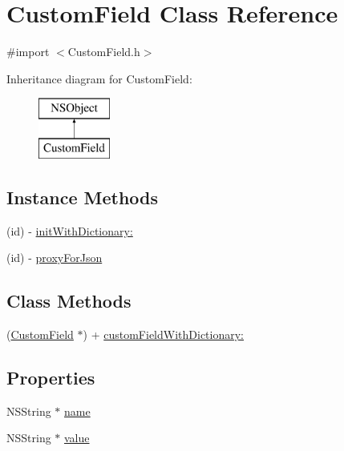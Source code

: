 \hypertarget{interface_custom_field}{\section{Custom\-Field Class Reference}
\label{interface_custom_field}
}


{\ttfamily \#import $<$Custom\-Field.\-h$>$}

Inheritance diagram for Custom\-Field\-:\begin{figure}[H]
\begin{center}
\leavevmode
\includegraphics[height=2.000000cm]{interface_custom_field}
\end{center}
\end{figure}
\subsection*{Instance Methods}
\begin{DoxyCompactItemize}
\item 
(id) -\/ \hyperlink{interface_custom_field_a7626174a904b8bb2ffb0a1f3335e11f3}{init\-With\-Dictionary\-:}
\item 
(id) -\/ \hyperlink{interface_custom_field_aa0ab1c5fe37cdc611dce98331c3d5137}{proxy\-For\-Json}
\end{DoxyCompactItemize}
\subsection*{Class Methods}
\begin{DoxyCompactItemize}
\item 
(\hyperlink{interface_custom_field}{Custom\-Field} $\ast$) + \hyperlink{interface_custom_field_a4d084b31194eebab5d4ec5a8e40fc854}{custom\-Field\-With\-Dictionary\-:}
\end{DoxyCompactItemize}
\subsection*{Properties}
\begin{DoxyCompactItemize}
\item 
N\-S\-String $\ast$ \hyperlink{interface_custom_field_a1814194d29f8a3be86cc84eced716cf3}{name}
\item 
N\-S\-String $\ast$ \hyperlink{interface_custom_field_a13d5a49c45fb733b3784ecc2fb53f643}{value}
\end{DoxyCompactItemize}


